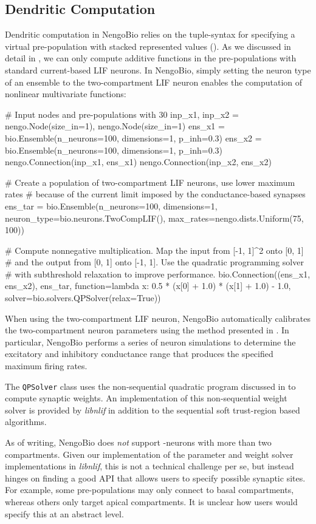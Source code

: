 \subsection{Dendritic Computation}
Dendritic computation in NengoBio relies on the tuple-syntax for specifying a virtual pre-population with stacked represented values ().
As we discussed in detail in , we can only compute additive functions in the pre-populations with standard current-based LIF neurons.
In NengoBio, simply setting the neuron type of an ensemble to the two-compartment LIF neuron enables the computation of nonlinear multivariate functions:
\begin{pythoncode}
# Input nodes and pre-populations with 30%
inp_x1, inp_x2 = nengo.Node(size_in=1), nengo.Node(size_in=1)
ens_x1  = bio.Ensemble(n_neurons=100, dimensions=1, p_inh=0.3)
ens_x2  = bio.Ensemble(n_neurons=100, dimensions=1, p_inh=0.3)
nengo.Connection(inp_x1, ens_x1)
nengo.Connection(inp_x2, ens_x2)

# Create a population of two-compartment LIF neurons, use lower maximum rates
# because of the current limit imposed by the conductance-based synapses
ens_tar = bio.Ensemble(n_neurons=100, dimensions=1,
                       neuron_type=bio.neurons.TwoCompLIF(),
                       max_rates=nengo.dists.Uniform(75, 100))

# Compute nonnegative multiplication. Map the input from [-1, 1]^2 onto [0, 1]
# and the output from [0, 1] onto [-1, 1]. Use the quadratic programming solver
# with subthreshold relaxation to improve performance.
bio.Connection((ens_x1, ens_x2), ens_tar,
               function=lambda x: 0.5 * (x[0] + 1.0) * (x[1] + 1.0) - 1.0,
               solver=bio.solvers.QPSolver(relax=True))
\end{pythoncode}
When using the two-compartment LIF neuron, NengoBio automatically calibrates the two-compartment neuron parameters using the method presented in .
In particular, NengoBio performs a series of neuron simulations to determine the excitatory and inhibitory conductance range that produces the specified maximum firing rates.

The \texttt{QPSolver} class uses the non-sequential quadratic program discussed in  to compute synaptic weights.
An implementation of this non-sequential weight solver is provided by \emph{libnlif} in addition to the sequential soft trust-region based algorithms.

As of writing, NengoBio does \emph{not} support \nlif-neurons with more than two compartments.
Given our implementation of the parameter and weight solver implementations in \emph{libnlif}, this is not a technical challenge per se, but instead hinges on finding a good API that allows users to specify possible synaptic sites.
For example, some pre-populations may only connect to basal compartments, whereas others only target apical compartments.
It is unclear how users would specify this at an abstract level.